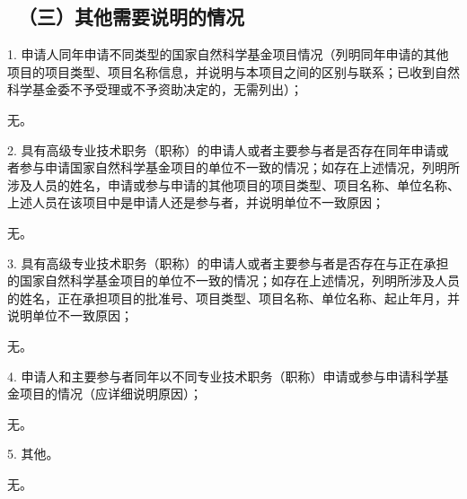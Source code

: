 {\color{MsBlue} \subsection{\sihao \kaishu \quad \ （三）其他需要说明的情况}}

{\sihao \kaishu \color{MsBlue}
	1. 申请人同年申请不同类型的国家自然科学基金项目情况（列明同年申请的其他项目的项目类型、项目名称信息，并说明与本项目之间的区别与联系；已收到自然科学基金委不予受理或不予资助决定的，无需列出）；
}

{\kaishu
	无。
}
\vspace{3mm}

{\sihao \kaishu \color{MsBlue}
	2. 具有高级专业技术职务（职称）的申请人或者主要参与者是否存在同年申请或者参与申请国家自然科学基金项目的单位不一致的情况；如存在上述情况，列明所涉及人员的姓名，申请或参与申请的其他项目的项目类型、项目名称、单位名称、上述人员在该项目中是申请人还是参与者，并说明单位不一致原因；
}


{\kaishu
	无。
}
\vspace{3mm}

{\sihao \kaishu \color{MsBlue}
	3. 具有高级专业技术职务（职称）的申请人或者主要参与者是否存在与正在承担的国家自然科学基金项目的单位不一致的情况；如存在上述情况，列明所涉及人员的姓名，正在承担项目的批准号、项目类型、项目名称、单位名称、起止年月，并说明单位不一致原因；
}

{\kaishu
	无。
}

\vspace{3mm}

{\sihao \kaishu \color{MsBlue}
	4. 申请人和主要参与者同年以不同专业技术职务（职称）申请或参与申请科学基金项目的情况（应详细说明原因）；
}

{\kaishu
	无。
}
\vspace{3mm}

{\sihao \kaishu \color{MsBlue}
	5. 其他。
}

{\kaishu
	无。
}